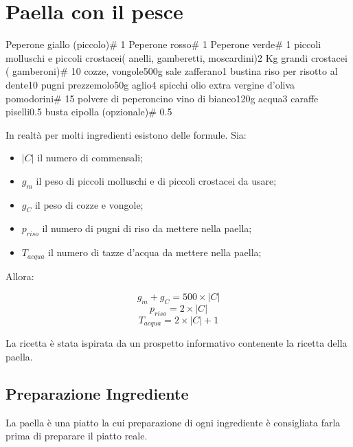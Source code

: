 \section{Paella con il pesce}

\generalRecipeInfos{}

\ingredienti%
    {Peperone giallo (piccolo)}{\# 1}%
    {Peperone rosso}{\# 1}%
    {Peperone verde}{\# 1}%
    {piccoli molluschi e piccoli crostacei(\eg{} anelli, gamberetti, moscardini)}{2 Kg}%
    {grandi crostacei (\eg{} gamberoni)}{\# 10}%
    {cozze, vongole}{500g}%
    {sale}{\qb{}}%
    {zafferano}{1 bustina}%
    {riso per risotto al dente}{10 pugni}%
    {prezzemolo}{50g}%
    {aglio}{4 spicchi}%
    {olio extra vergine d'oliva}{\qb{}}%
    {pomodorini}{\# 15}%
    {polvere di peperoncino}{\qb{}}%
    {vino di bianco}{120g}%
    {acqua}{3 caraffe}%
    {piselli}{0.5 busta}%
    {cipolla (opzionale)}{\# 0.5}%

In realtà per molti ingredienti esistono delle formule.
Sia:

\begin{itemize}
    \item $|C|$ il numero di commensali;
    \item $g_m$ il peso di piccoli molluschi e di piccoli crostacei da usare;
    \item $g_C$ il peso di cozze e vongole;
    \item $p_{riso}$ il numero di pugni di riso da mettere nella paella;
    \item $T_{acqua}$ il numero di tazze d'acqua da mettere nella paella;
\end{itemize}

Allora:

$$g_m + g_C = 500 \times |C|$$
$$p_{riso} = 2 \times |C|$$
$$T_{acqua} = 2 \times |C| + 1$$


La ricetta è stata ispirata da un prospetto informativo contenente la ricetta della paella\cite{bialetti-1999a}.

\subsection{Preparazione Ingrediente}

La paella è una piatto la cui preparazione di ogni ingrediente è consigliata farla prima di preparare il piatto reale.

